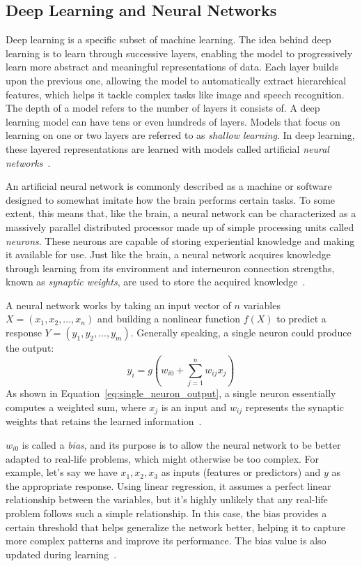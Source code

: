 \documentclass[a4paper,oneside,onecolumn,12pt]{book}
\begin{document}
	\subsection{Deep Learning and Neural Networks}
	Deep learning is a specific subset of machine learning. The idea behind deep learning is to learn through successive layers, enabling the model to progressively learn more abstract and meaningful representations of data. Each layer builds upon the previous one, allowing the model to automatically extract hierarchical features, which helps it tackle complex tasks like image and speech recognition. The depth of a model refers to the number of layers it consists of. A deep learning model can have tens or even hundreds of layers. Models that focus on learning on one or two layers are referred to as \textit{shallow learning}. In deep learning, these layered representations are learned with models called artificial \textit{neural networks}~\cite{DLP}.

	An artificial neural network is commonly described as a machine or software designed to somewhat imitate how the brain performs certain tasks. To some extent, this means that, like the brain, a neural network can be characterized as a massively parallel distributed processor made up of simple processing units called \textit{neurons}. These neurons are capable of storing experiential knowledge and making it available for use. Just like the brain, a neural network acquires knowledge through learning from its environment and interneuron connection strengths, known as \textit{synaptic weights}, are used to store the acquired knowledge~\cite{NNACF}.

	A neural network works by taking an input vector of $n$ variables $X = (x_1, x_2, ..., x_n)$ and building a nonlinear function $f(X)$ to predict a response $Y = (y_1, y_2, ..., y_m)$. Generally speaking, a single neuron could produce the output:
	\begin{equation}
		y_i = g\left( w_{i0} + \sum_{j=1}^{n} w_{ij} x_j \right)
		\label{eq:single_neuron_output}
	\end{equation}
	As shown in Equation~\ref{eq:single_neuron_output}, a single neuron essentially computes a weighted sum, where $x_j$ is an input and $w_{ij}$ represents the synaptic weights that retains the learned information~\cite{AISL}.

	$w_{i0}$ is called a \textit{bias}, and its purpose is to allow the neural network to be better adapted to real-life problems, which might otherwise be too complex. For example, let's say we have $x_1, x_2, x_3$ as inputs (features or predictors) and $y$ as the appropriate response. Using linear regression, it assumes a perfect linear relationship between the variables, but it's highly unlikely that any real-life problem follows such a simple relationship. In this case, the bias provides a certain threshold that helps generalize the network better, helping it to capture more complex patterns and improve its performance. The bias value is also updated during learning~\cite{AISL}.
\end{document}
